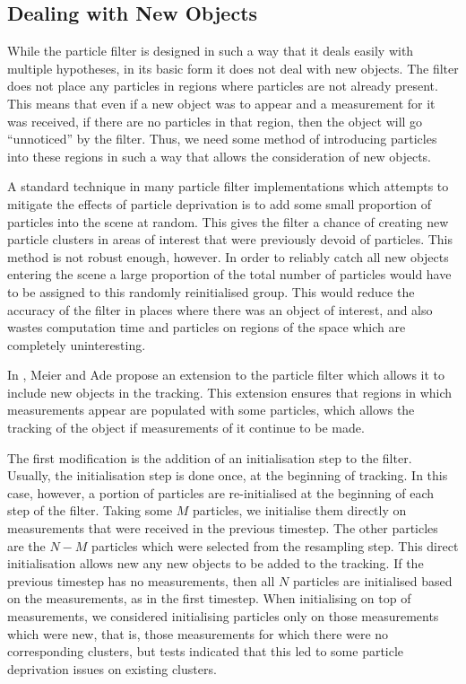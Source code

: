 \documentclass[conference]{IEEEtran}
\begin{document}
\subsection{Dealing with New Objects}

While the particle filter is designed in such a way that it deals easily with
multiple hypotheses, in its basic form it does not deal with new objects. The
filter does not place any particles in regions where particles are not already
present. This means that even if a new object was to appear and a measurement
for it was received, if there are no particles in that region, then the object
will go ``unnoticed'' by the filter. Thus, we need some method of introducing
particles into these regions in such a way that allows the consideration of new
objects.

A standard technique in many particle filter implementations which attempts to
mitigate the effects of particle deprivation is to add some small proportion of
particles into the scene at random. This gives the filter a chance of creating
new particle clusters in areas of interest that were previously devoid of
particles. This method is not robust enough, however. In order to reliably catch
all new objects entering the scene a large proportion of the total number of
particles would have to be assigned to this randomly reinitialised group. This
would reduce the accuracy of the filter in places where there was an object of
interest, and also wastes computation time and particles on regions of the space
which are completely uninteresting.

In \cite{meier1999tracking}, Meier and Ade propose an extension to the particle
filter which allows it to include new objects in the tracking. This extension
ensures that regions in which measurements appear are populated with some
particles, which allows the tracking of the object if measurements of it
continue to be made.

The first modification is the addition of an initialisation step to the
filter. Usually, the initialisation step is done once, at the beginning of
tracking. In this case, however, a portion of particles are re-initialised at
the beginning of each step of the filter. Taking some $M$ particles, we
initialise them directly on measurements that were received in the previous
timestep. The other particles are the $N-M$ particles which were selected from
the resampling step. This direct initialisation allows new any new objects to be
added to the tracking. If the previous timestep has no measurements, then all
$N$ particles are initialised based on the measurements, as in the first
timestep. When initialising on top of measurements, we considered initialising
particles only on those measurements which were new, that is, those measurements
for which there were no corresponding clusters, but tests indicated that this
led to some particle deprivation issues on existing clusters.
\end{document}
